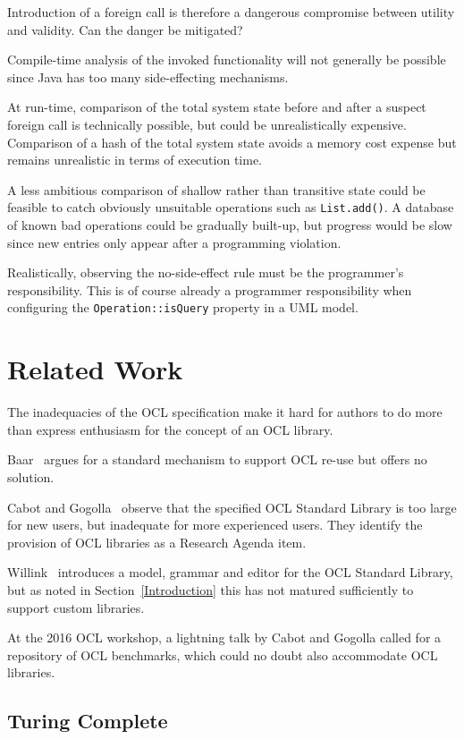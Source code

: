 \documentclass[sigconf]{acmart}
\begin{document}
Introduction of a foreign call is therefore a dangerous compromise between utility and validity. Can the danger be mitigated?

Compile-time analysis of the invoked functionality will not generally be possible since Java has too many side-effecting mechanisms.

At run-time, comparison of the total system state before and after a suspect foreign call is technically possible, but could be unrealistically expensive. Comparison of a hash of the total system state avoids a memory cost expense but remains unrealistic in terms of execution time.

A less ambitious comparison of shallow rather than transitive state could be feasible to catch obviously unsuitable operations such as \verb|List.add()|. A database of known bad operations could be gradually built-up, but progress would be slow since new entries only appear after a programming violation.

Realistically, observing the no-side-effect rule must be the programmer's responsibility. This is of course already a programmer responsibility when configuring the \verb|Operation::isQuery| property in a UML model.

\section{Related Work}\label{Related Work}

The inadequacies of the OCL specification make it hard for authors to do more than express enthusiasm for the concept of an OCL library.

Baar~\cite{Baar2011} argues for a standard mechanism to support OCL re-use but offers no solution. 

Cabot and Gogolla~\cite{Cabot2012} observe that the specified OCL Standard Library is too large for new users, but inadequate for more experienced users. They identify the provision of OCL libraries as a Research Agenda item. 

Willink~\cite{Willink2011} introduces a model, grammar and editor for the OCL Standard Library, but as noted in Section~\ref{Introduction} this has not matured sufficiently to support custom libraries. 

At the 2016 OCL workshop, a lightning talk by Cabot and Gogolla called for a repository of OCL benchmarks, which could no doubt also accommodate OCL libraries.

\subsection{Turing Complete}\label{Turing Complete}
\end{document}
